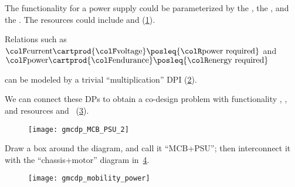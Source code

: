 \begin{example}

    The functionality for a power supply could be parameterized by the , the , and the .
    The resources could include  and  (\cref{fig:example-ba}).

    \begin{figure}[h!]
        \centering
        \caption{}
        \label{fig:example-ba}
    \end{figure}


    Relations such as ${\colF\mbox{current}}\cartprod{\colF\mbox{voltage}}\posleq{\colR\mbox{power required}}$
    and ${\colF\mbox{power}}\cartprod{\colF\mbox{endurance}}\posleq{\colR\mbox{energy required}}$

    can be modeled by a trivial ``multiplication'' DPI (\cref{fig:current_times_voltage}).

    \begin{figure}[h!]
        \centering
        \caption{}
        \label{fig:current_times_voltage}
    \end{figure}


    We can connect these DPs to obtain a co-design problem with functionality , ,  and resources  and ~(\cref{fig:connect}).

    \begin{figure}[h!]
        \centering
        \texttt{[image: gmcdp\_MCB\_PSU\_2]}
        \caption{}
        \label{fig:connect}
    \end{figure}


    Draw a box around the diagram, and call it ``MCB+PSU'';
    then interconnect it with the ``chassis+motor'' diagram in~\cref{fig:another}.

    \begin{figure}[h!]
        \centering
        \texttt{[image: gmcdp\_mobility\_power]}
        \caption{}
        \label{fig:another}
    \end{figure}


\end{example}
